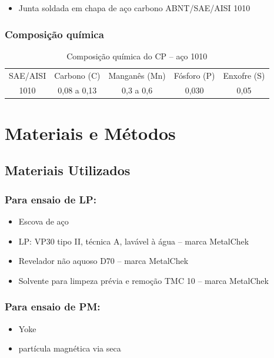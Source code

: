 \documentclass[12pt,oneside]{article}
\begin{document}
\begin{itemize}
    \item Junta soldada em chapa de aço carbono ABNT/SAE/AISI 1010
\end{itemize}

\subsubsection{Composição química}

\begin{table}[H]
    \label{tab:composição}
    \centering
    \caption{Composição química do CP -- aço 1010}
    \begin{tabular}{ccccc}
        \toprule
        SAE/AISI & Carbono (C) & Manganês (Mn) & Fósforo (P) & Enxofre (S) \\
        1010 & 0,08 a 0,13 & 0,3 a 0,6 & 0,030 & 0,05 \\
        \bottomrule

    \end{tabular}
\end{table}

\section{Materiais e Métodos}

\subsection{Materiais Utilizados}
\subsubsection{Para ensaio de LP:}
\begin{itemize}
    \item Escova de aço
    \item LP: VP30 tipo II, técnica A, lavável à água -- marca MetalChek
    \item Revelador não aquoso D70 -- marca MetalChek
    \item Solvente para limpeza prévia e remoção TMC 10 -- marca MetalChek
\end{itemize}

\subsubsection{Para ensaio de PM:}
\begin{itemize}
    \item Yoke
    \item partícula magnética via seca
\end{itemize}
\end{document}
